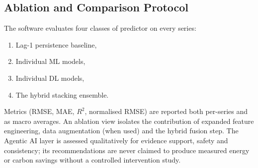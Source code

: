 \subsection{Ablation and Comparison Protocol}
The software evaluates four classes of predictor on every series:

\begin{enumerate}
    \item Lag-1 persistence baseline,
    \item Individual ML models,
    \item Individual DL models,
    \item The hybrid stacking ensemble.
\end{enumerate}

Metrics (RMSE, MAE, $R^2$, normalised RMSE) are reported both
per-series and as macro averages.  An ablation view isolates the
contribution of expanded feature engineering, data augmentation
(when used) and the hybrid fusion step.  The Agentic AI layer is
assessed qualitatively for evidence support, safety and consistency;
its recommendations are never claimed to produce measured energy or
carbon savings without a controlled intervention study.
